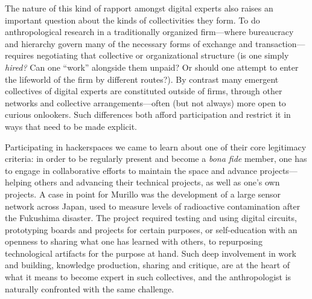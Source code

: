 \documentclass[10pt,letter,oneside]{scrartcl}
\begin{document}
The nature of this kind of rapport amongst digital experts also raises
an important question about the kinds of collectivities they form.  To
do anthropological research in a traditionally organized firm---where
bureaucracy and hierarchy govern many of the necessary forms of
exchange and transaction---requires negotiating that collective or
organizational structure (is one simply \emph{hired?} Can one ``work''
alongside them unpaid? Or should one attempt to enter the lifeworld of
the firm by different routes?).  By contrast many emergent collectives
of digital experts are constituted outside of firms, through other
networks and collective arrangements---often (but not always) more
open to curious onlookers.  Such differences both afford participation
and restrict it in ways that need to be made explicit.

Participating in hackerspaces we came to learn about one of their core
legitimacy criteria: in order to be regularly present and become a
\emph{bona fide} member, one has to engage in collaborative efforts to
maintain the space and advance projects---helping others and advancing
their technical projects, as well as one's own projects.  A case in point for Murillo was
the development of a large sensor network across Japan, used to
measure levels of radioactive contamination after the Fukushima
disaster.  The project required testing and using digital circuits,
prototyping boards and projects for certain purposes, or
self-education with an openness to sharing what one has learned with
others, to repurposing technological artifacts for the purpose at
hand.  Such deep involvement in work and building, knowledge
production, sharing and critique, are at the heart of what it means to
become expert in such collectives, and the anthropologist is naturally
confronted with the same challenge.



\end{document}
